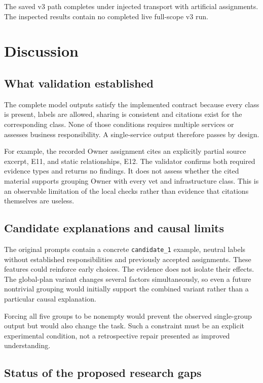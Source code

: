 The saved v3 path completes under injected transport with artificial assignments. The inspected results contain no completed live full-scope v3 run.

\section{Discussion}

\subsection{What validation established}

The complete model outputs satisfy the implemented contract because every class is present, labels are allowed, sharing is consistent and citations exist for the corresponding class. None of those conditions requires multiple services or assesses business responsibility. A single-service output therefore passes by design.

For example, the recorded Owner assignment cites an explicitly partial source excerpt, E11, and static relationships, E12. The validator confirms both required evidence types and returns no findings. It does not assess whether the cited material supports grouping Owner with every vet and infrastructure class. This is an observable limitation of the local checks rather than evidence that citations themselves are useless.

\subsection{Candidate explanations and causal limits}

The original prompts contain a concrete \texttt{candidate\_1} example, neutral labels without established responsibilities and previously accepted assignments. These features could reinforce early choices. The evidence does not isolate their effects. The global-plan variant changes several factors simultaneously, so even a future nontrivial grouping would initially support the combined variant rather than a particular causal explanation.

Forcing all five groups to be nonempty would prevent the observed single-group output but would also change the task. Such a constraint must be an explicit experimental condition, not a retrospective repair presented as improved understanding.

\subsection{Status of the proposed research gaps}

